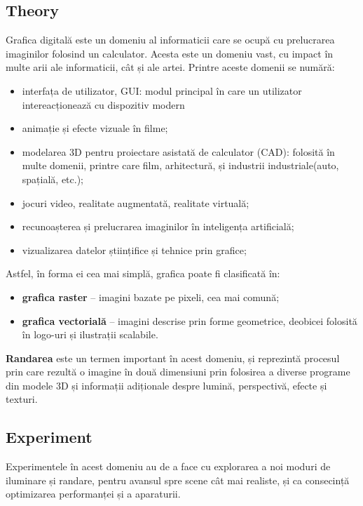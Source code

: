 \documentclass[12pt, letterpaper]{article}
\begin{document}
\subsection*{Theory}
Grafica digitală este un domeniu al informaticii care se ocupă cu prelucrarea imaginilor folosind un calculator. Acesta este un domeniu vast, cu impact în multe arii ale informaticii, cât și ale artei.
Printre aceste domenii se numără:
\begin{itemize}
    \item interfața de utilizator, GUI: modul principal în care un utilizator intereacționează cu dispozitiv modern
    
    \item animație și efecte vizuale în filme;
    
    \item modelarea 3D pentru proiectare asistată de calculator (CAD): folosită în multe domenii, printre care film, arhitectură, și industrii industriale(auto, spațială, etc.);

    \item jocuri video, realitate augmentată, realitate virtuală;
    
    \item recunoașterea și prelucrarea imaginilor în inteligența artificială;

    \item vizualizarea datelor științifice și tehnice prin grafice;
\end{itemize}
\bigskip
Astfel, în forma ei cea mai simplă, grafica poate fi clasificată în:
\begin{itemize}
    \item \textbf{grafica raster} – imagini bazate pe pixeli, cea mai comună;
    \item \textbf{grafica vectorială} – imagini descrise prin forme geometrice, deobicei folosită în logo-uri și ilustrații scalabile.
\end{itemize}

\textbf{Randarea} este un termen important în acest domeniu, și reprezintă procesul prin care rezultă o imagine în două dimensiuni prin folosirea a diverse programe din modele 3D și informații adiționale despre lumină, perspectivă, efecte și texturi. 


\subsection*{Experiment}
Experimentele în acest domeniu au de a face cu explorarea a noi moduri de iluminare și randare, pentru avansul spre scene cât mai realiste, și ca consecință optimizarea performanței și a aparaturii. 
\end{document}
